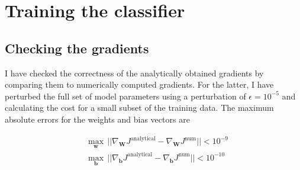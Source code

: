 \documentclass{article}
\begin{document}
\newpage
\section*{Training the classifier}
\vspace{0.5cm}
\subsection*{Checking the gradients}
	I have checked the correctness of the analytically obtained gradients by comparing them to numerically computed gradients. For the latter, I have perturbed the full set of model parameters using a perturbation of $\epsilon = 10^{-5}$ and calculating the cost for a small subset of the training data. The maximum absolute errors for the weights and bias vectors are 

	\begin{align*}
		&\max_{\bm{w}}\, \big\vert\big\vert \nabla_{\bm{W}} J^{\text{analytical}} - \nabla_{\bm{W}} J^{\text{num}} \big\vert\big\vert < 10^{-9} \\
		&\max_{\bm{b}}\, \big\vert\big\vert \nabla_{\bm{b}} J^{\text{analytical}} - \nabla_{\bm{b}} J^{\text{num}} \big\vert\big\vert < 10^{-10}
	\end{align*}
\end{document}
